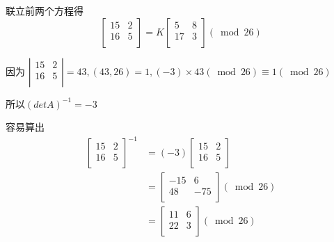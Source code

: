 \documentclass[UTF8]{ctexart}
\begin{document}
\begin{enumerate}[label={[}\arabic*{]}]
  联立前两个方程得
  $$
  \left[ \begin{matrix} 15 &2\\ 16 &5\\ \end{matrix}\right]=K\left[ \begin{matrix} 5 &8\\ 17 &3\\ \end{matrix}\right](\bmod 26)
  $$

  因为
  $\left| \begin{matrix} 15 &2\\ 16 &5\\ \end{matrix}\right|=43, (43,26)=1, (-3)\times 43(\bmod 26)\equiv 1(\bmod 26)$

  所以$(detA)^{-1}=-3$

  容易算出
  $$
  \begin{aligned}
    \left[ \begin{matrix} 15 &2\\ 16 &5\\ \end{matrix}\right]^{-1}&=(-3)\left[ \begin{matrix} 15 &2\\ 16 &5\\ \end{matrix}\right]\\
      &=\left[ \begin{matrix} -15 &6\\ 48 &-75\\ \end{matrix}\right](\bmod 26)\\
      &=\left[ \begin{matrix} 11 &6\\ 22 &3\\ \end{matrix}\right](\bmod 26)\\
  \end{aligned}
  $$


\end{enumerate}
\end{document}
